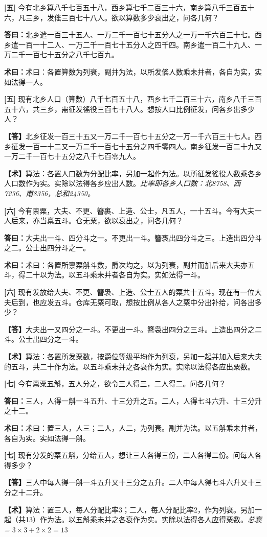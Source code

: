\documentclass[10pt,a4paper]{article}
\newlength{\lw}
\newlength{\rw}
\newcommand{\bilingc}[2]{%
  \par\vspace{0.1em}%
  \noindent\begin{minipage}[t]{\lw}
  {\small #1}
  \end{minipage}%
  \hfill%
  \begin{minipage}[t]{\rw}
  {\small #2}
  \end{minipage}%
  \vspace{0.1em}%
}
\newcommand{\da}{\textbf{\textcolor{answercolor}{答曰：}}}
\newcommand{\daB}{\textbf{\textcolor{answercolor}{【答】}}}
\newcommand{\shu}{\textbf{\textcolor{methodcolor}{术曰：}}}
\newcommand{\shuB}{\textbf{\textcolor{methodcolor}{【术】}}}
\newcommand{\pn}[1]{\textbf{[#1]}}
\begin{document}
\vspace{0.3em}

\bilingc{
\pn{五} 今有北乡算八千七百五十八，西乡算七千二百三十六，南乡算八千三百五十六，凡三乡，发傜三百七十八人。欲以算数多少衰出之，问各几何？

\da 北乡遣一百三十五人、一万二千一百七十五分人之一万一千六百三十七。西乡遣一百一十二人、一万二千一百七十五分人之四千四。南乡遣一百二十九人、一万二千一百七十五分之八千七百九。

\shu 术曰：各置算数为列衰，副并为法，以所发傜人数乘未并者，各自为实，实如法得一人。
}{
\pn{五} 现有北乡人口（算数）八千七百五十八，西乡七千二百三十六，南乡八千三百五十六，共三乡，需征发徭役三百七十八人。想按人口比例征发，问各乡出多少人？

\daB 北乡征发一百三十五又一万二千一百七十五分之一万一千六百三十七人。西乡征发一百一十二又一万二千一百七十五分之四千零四人。南乡征发一百二十九又一万二千一百七十五分之八千七百零九人。

\shuB 算法：各置人口数为分配比率，另加一起作为法。以所征发徭役人数乘各乡人口数作为实。实除以法得各乡应出人数。\textit{比率即各乡人口数：北8758、西7236、南8356，总和24350。}
}

\vspace{0.3em}

\bilingc{
\pn{六} 今有禀粟，大夫、不更、簪裹、上造、公士，凡五人，一十五斗。今有大夫一人后来，亦当禀五斗。仓无粟，欲以衰出之，问各几何？

\da 大夫出一斗、四分斗之一。不更出一斗。簪褭出四分斗之三。上造出四分斗之二。公士出四分斗之一。

\shu 术曰：各置所禀粟斛斗数，爵次均之，以为列衰，副并而加后来大夫亦五斗，得二十以为法。以五斗乘未并者各自为实。实如法得一斗。
}{
\pn{六} 现有发放给大夫、不更、簪袅、上造、公士五人的粟共十五斗。现在有一位大夫后到，也应发五斗。仓库无粟可取，想按比例从各人之粟中分出补给，问各出多少？

\daB 大夫出一又四分之一斗。不更出一斗。簪袅出四分之三斗。上造出四分之二斗。公士出四分之一斗。

\shuB 算法：各置所发粟数，按爵位等级平均作为列衰，另加一起并加入后来大夫的五斗，共二十作为法。以五斗乘未并之各衰作为实。实除以法得各应出粟数。
}

\vspace{0.3em}

\bilingc{
\pn{七} 今有禀粟五斛，五人分之，欲令三人得三，二人得二。问各几何？

\da 三人，人得一斛一斗五升、十三分升之五。二人，人得七斗六升、十三分升之十二。

\shu 术曰：置三人，人三；二人，人二，为列衰。副并为法。以五斛乘未并者，各自为实。实如法得一斛。
}{
\pn{七} 现有分发的粟五斛，分给五人，想让三人各得三份，二人各得二份。问每人各得多少？

\daB 三人中每人得一斛一斗五升又十三分之五升。二人中每人得七斗六升又十三分之十二升。

\shuB 算法：置三人，每人分配比率3；二人，每人分配比率2，作为列衰。另加一起（共13）作为法。以五斛乘未并之各衰作为实。实除以法得各人应得粟数。\textit{总衰 = $3\times3+2\times2=13$}
}
\end{document}
